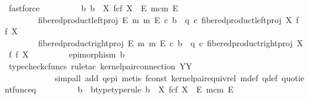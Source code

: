 \begin{isabellebody}
\ fastforce\isanewline
\ \ \ \ \ \ \isamarkupfalse%
\ \isamarkupfalse%
\ {\isachardoublequoteopen}{\isasymexists}{\isacharbang}{\kern0pt}b{\isachardot}{\kern0pt}\ b\ {\isacharcolon}{\kern0pt}\ X\ \isactrlbsub f\isactrlesub {\isasymtimes}\isactrlsub c\isactrlbsub f\isactrlesub \ X\ {\isasymrightarrow}\ E\ \isactrlbsub m\isactrlesub {\isasymtimes}\isactrlsub c\isactrlbsub m\isactrlesub \ E\ {\isasymand}\isanewline
\ \ \ \ \ \ \ \ fibered{\isacharunderscore}{\kern0pt}product{\isacharunderscore}{\kern0pt}left{\isacharunderscore}{\kern0pt}proj\ E\ m\ m\ E\ {\isasymcirc}\isactrlsub c\ b\ {\isacharequal}{\kern0pt}\ q\ {\isasymcirc}\isactrlsub c\ fibered{\isacharunderscore}{\kern0pt}product{\isacharunderscore}{\kern0pt}left{\isacharunderscore}{\kern0pt}proj\ X\ f\ f\ X\ {\isasymand}\isanewline
\ \ \ \ \ \ \ \ fibered{\isacharunderscore}{\kern0pt}product{\isacharunderscore}{\kern0pt}right{\isacharunderscore}{\kern0pt}proj\ E\ m\ m\ E\ {\isasymcirc}\isactrlsub c\ b\ {\isacharequal}{\kern0pt}\ q\ {\isasymcirc}\isactrlsub c\ fibered{\isacharunderscore}{\kern0pt}product{\isacharunderscore}{\kern0pt}right{\isacharunderscore}{\kern0pt}proj\ X\ f\ f\ X\ {\isasymand}\isanewline
\ \ \ \ \ \ \ \ epimorphism\ b{\isachardoublequoteclose}\isanewline
\ \ \ \ \ \ \ \ \isamarkupfalse%
\ {\isacharparenleft}{\kern0pt}typecheck{\isacharunderscore}{\kern0pt}cfuncs{\isacharcomma}{\kern0pt}\ rule{\isacharunderscore}{\kern0pt}tac\ kernel{\isacharunderscore}{\kern0pt}pair{\isacharunderscore}{\kern0pt}connection{\isacharbrackleft}{\kern0pt}\ Y{\isacharequal}{\kern0pt}Y{\isacharbrackright}{\kern0pt}{\isacharcomma}{\kern0pt}\isanewline
\ \ \ \ \ \ \ \ \ \ \ \ simp{\isacharunderscore}{\kern0pt}all\ add{\isacharcolon}{\kern0pt}\ q{\isacharunderscore}{\kern0pt}epi{\isacharcomma}{\kern0pt}\ metis\ f{\isacharunderscore}{\kern0pt}const\ kernel{\isacharunderscore}{\kern0pt}pair{\isacharunderscore}{\kern0pt}equiv{\isacharunderscore}{\kern0pt}rel\ m{\isacharunderscore}{\kern0pt}def\ q{\isacharunderscore}{\kern0pt}def\ quotient{\isacharunderscore}{\kern0pt}func{\isacharunderscore}{\kern0pt}eq{\isacharparenright}{\kern0pt}\isanewline
\ \ \ \ \ \ \isamarkupfalse%
\ \isamarkupfalse%
\ b\ \ b{\isacharunderscore}{\kern0pt}type{\isacharbrackleft}{\kern0pt}type{\isacharunderscore}{\kern0pt}rule{\isacharbrackright}{\kern0pt}{\isacharcolon}{\kern0pt}\ {\isachardoublequoteopen}b\ {\isacharcolon}{\kern0pt}\ X\ \isactrlbsub f\isactrlesub {\isasymtimes}\isactrlsub c\isactrlbsub f\isactrlesub \ X\ {\isasymrightarrow}\ E\ \isactrlbsub m\isactrlesub {\isasymtimes}\isactrlsub c\isactrlbsub m\isactrlesub \ E{\isachardoublequoteclose}\ \isanewline

\end{isabellebody}
